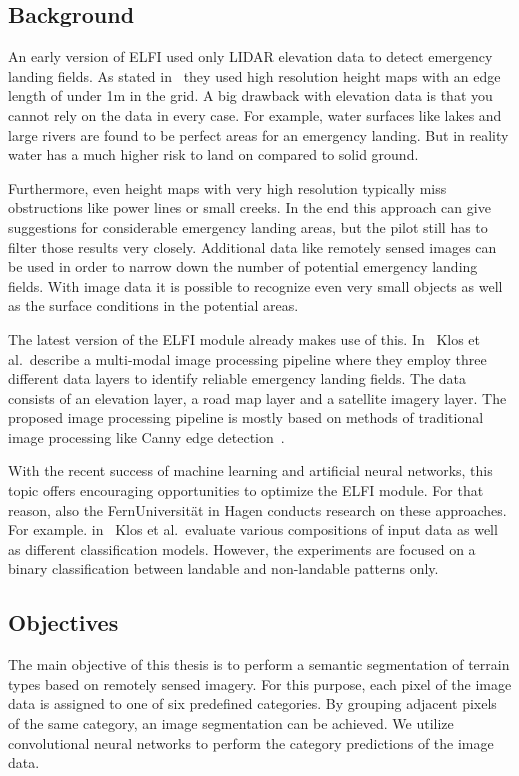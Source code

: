 \subsection{Background}
An early version of ELFI used only LIDAR elevation data to detect emergency landing fields. As stated in~\cite{feu_elfi} they used high resolution height maps with an edge length of under 1m in the grid. A big drawback with elevation data is that you cannot rely on the data in every case. For example, water surfaces like lakes and large rivers are found to be perfect areas for an emergency landing. But in reality water has a much higher risk to land on compared to solid ground.

Furthermore, even height maps with very high resolution typically miss obstructions like power lines or small creeks. In the end this approach can give suggestions for considerable emergency landing areas, but the pilot still has to filter those results very closely. Additional data like remotely sensed images can be used in order to narrow down the number of potential emergency landing fields. With image data it is possible to recognize even very small objects as well as the surface conditions in the potential areas.

The latest version of the ELFI module already makes use of this. In~\cite{elfi_pipeline19} Klos et al.\ describe a multi-modal image processing pipeline where they employ three different data layers to identify reliable emergency landing fields. The data consists of an elevation layer, a road map layer and a satellite imagery layer. The proposed image processing pipeline is mostly based on methods of traditional image processing like Canny edge detection~\cite{canny_edge86}.

With the recent success of machine learning and artificial neural networks, this topic offers encouraging opportunities to optimize the ELFI module. For that reason, also the FernUniversität in Hagen conducts research on these approaches. For example. in~\cite{elfi_transfer20} Klos et al.\ evaluate various compositions of input data as well as different classification models. However, the experiments are focused on a binary classification between landable and non-landable patterns only.

\subsection{Objectives}
The main objective of this thesis is to perform a semantic segmentation of terrain types based on remotely sensed imagery. For this purpose, each pixel of the image data is assigned to one of six predefined categories. By grouping adjacent pixels of the same category, an image segmentation can be achieved. We utilize convolutional neural networks to perform the category predictions of the image data.

